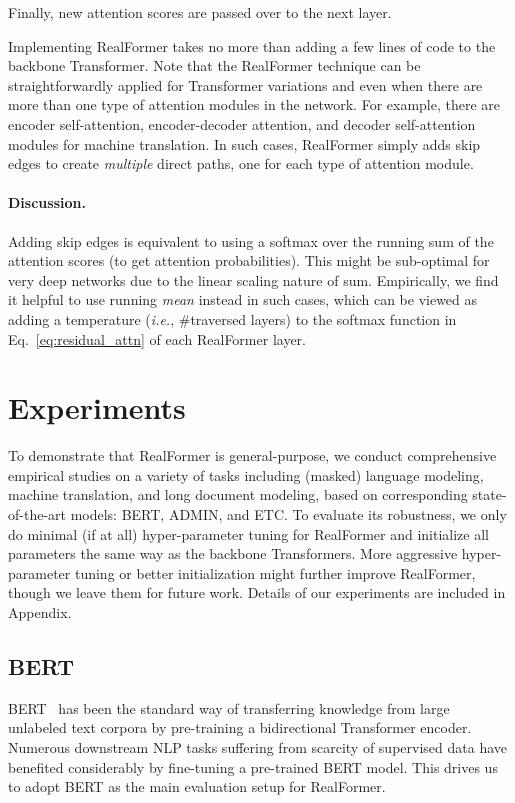 \documentclass[11pt,a4paper]{article}
\begin{document}
Finally, new attention scores  are passed over to the next layer.

Implementing RealFormer takes no more than adding a few lines of code to the backbone Transformer. Note that the RealFormer technique can be straightforwardly applied for Transformer variations and even when there are more than one type of attention modules in the network. For example, there are encoder self-attention, encoder-decoder attention, and decoder self-attention modules for machine translation. In such cases, RealFormer simply adds skip edges to create \emph{multiple} direct paths, one for each type of attention module.

\paragraph{Discussion.} Adding skip edges is equivalent to using a softmax over the running sum of the attention scores (to get attention probabilities). This might be sub-optimal for very deep networks due to the linear scaling nature of sum. Empirically, we find it helpful to use running \emph{mean} instead in such cases, which can be viewed as adding a temperature (\emph{i.e.}, \#traversed layers) to the softmax function in Eq.~\ref{eq:residual_attn} of each RealFormer layer.



\section{Experiments} \label{sect:exp}
To demonstrate that RealFormer is general-purpose, we conduct comprehensive empirical studies on a variety of tasks including (masked) language modeling, machine translation, and long document modeling, based on corresponding state-of-the-art models: BERT, ADMIN, and ETC.
To evaluate its robustness, we only do minimal (if at all) hyper-parameter tuning for RealFormer and initialize all parameters the same way as the backbone Transformers.
More aggressive hyper-parameter tuning or better initialization might further improve RealFormer, though we leave them for future work.
Details of our experiments are included in Appendix.

\subsection{BERT} \label{sec:bert}
BERT~\citep{Devlin-2019-bert} has been the standard way of transferring knowledge from large unlabeled text corpora by pre-training a bidirectional Transformer encoder. Numerous downstream NLP tasks suffering from scarcity of supervised data have benefited considerably by fine-tuning a pre-trained BERT model. This drives us to adopt BERT as the main evaluation setup for RealFormer.
\end{document}
